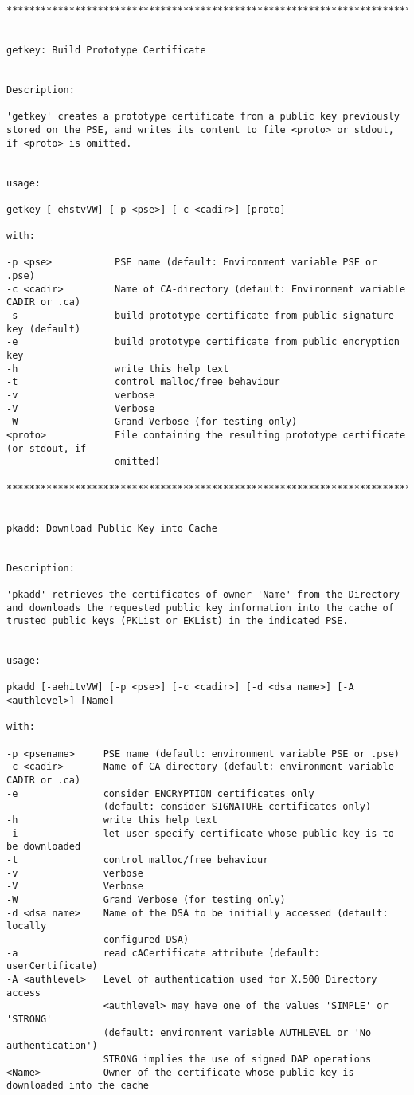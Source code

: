 {\begin{verbatim}
****************************************************************************************


getkey: Build Prototype Certificate


Description:

'getkey' creates a prototype certificate from a public key previously
stored on the PSE, and writes its content to file <proto> or stdout,
if <proto> is omitted.


usage:

getkey [-ehstvVW] [-p <pse>] [-c <cadir>] [proto]

with:

-p <pse>           PSE name (default: Environment variable PSE or .pse)
-c <cadir>         Name of CA-directory (default: Environment variable CADIR or .ca)
-s                 build prototype certificate from public signature key (default)
-e                 build prototype certificate from public encryption key
-h                 write this help text
-t                 control malloc/free behaviour
-v                 verbose
-V                 Verbose
-W                 Grand Verbose (for testing only)
<proto>            File containing the resulting prototype certificate (or stdout, if 
                   omitted)

****************************************************************************************


pkadd: Download Public Key into Cache


Description:

'pkadd' retrieves the certificates of owner 'Name' from the Directory
and downloads the requested public key information into the cache of
trusted public keys (PKList or EKList) in the indicated PSE.


usage:

pkadd [-aehitvVW] [-p <pse>] [-c <cadir>] [-d <dsa name>] [-A <authlevel>] [Name]

with:

-p <psename>     PSE name (default: environment variable PSE or .pse)
-c <cadir>       Name of CA-directory (default: environment variable CADIR or .ca)
-e               consider ENCRYPTION certificates only
                 (default: consider SIGNATURE certificates only)
-h               write this help text
-i               let user specify certificate whose public key is to be downloaded
-t               control malloc/free behaviour
-v               verbose
-V               Verbose
-W               Grand Verbose (for testing only)
-d <dsa name>    Name of the DSA to be initially accessed (default: locally 
                 configured DSA)
-a               read cACertificate attribute (default: userCertificate)
-A <authlevel>   Level of authentication used for X.500 Directory access
                 <authlevel> may have one of the values 'SIMPLE' or 'STRONG'
                 (default: environment variable AUTHLEVEL or 'No authentication')
                 STRONG implies the use of signed DAP operations
<Name>           Owner of the certificate whose public key is downloaded into the cache


\end{verbatim}}
